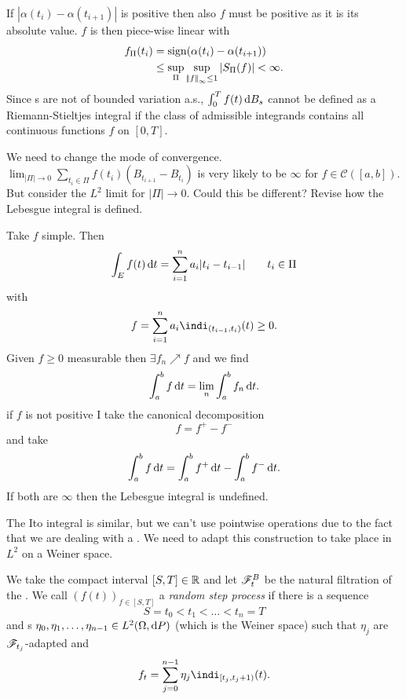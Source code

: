 \documentclass[crop=false, class=article]{standalone}
\begin{document}
\begin{fancyproof}
\begin{figure}[H]
		\label{fig:screenshot001}
	\end{figure}
	If $|\alpha(t_{i})-\alpha(t_{i+1})|$ is positive then also $f$ must be positive as it is its absolute value. $f$ is then piece-wise linear with 
	\begin{align*}
		f_{\Pi}(t_{i}) & =\mathrm{sign}(\alpha(t_{i})-\alpha(t_{i+1}))\\
		 & \leq\sup_{\Pi}\sup_{\left|\negthinspace\left|f\right|\negthinspace\right|_{\infty}\leq1}|S_{\Pi}(f)|<\infty.
	\end{align*}
	Since \brm s are not of bounded variation a.s., $\int_{0}^{T}f(t)\mathop{}\!\mathrm{d} B_{s}$ cannot be defined as a Riemann-Stieltjes integral if the class of admissible integrands contains all continuous functions $f$ on $[0,T]$.
\end{fancyproof}
We need to change the mode of convergence. $\lim_{|\Pi|\to 0}\sum_{t_i\in\Pi}f(t_{i})(B_{t_{i+1}}-B_{t_{i}})$ is very likely to be $\infty$ for $f\in\mathcal{C}([a,b])$. But consider the $L^{2}$ limit for $|\Pi|\to0$. Could this be different? Revise how the Lebesgue integral is defined.
\begin{revise}
	Take $f$ simple. Then
	\begin{equation*}
		\int_{E}f(t)\mathop{}\!\mathrm{d} t=\sum_{i=1}^{n}a_{i}|t_{i}-t_{i-1}| \qquad t_{i}\in\Pi
	\end{equation*}
	with
	\begin{equation*}
		f=\sum_{i=1}^{n}a_{i}\indi_{(t_{i-1},t_{i})}(t)\geq0.
	\end{equation*}
	Given $f\geq0$ measurable then $\exists f_{n}\nearrow f$ and we find
	\begin{equation*}
		\int_{a}^{b}f\mathop{}\!\mathrm{d} t=\lim_{n}\int_{a}^{b}f_{n}\mathop{}\!\mathrm{d} t.
	\end{equation*}
	if $f$ is not positive I take the canonical decomposition
	\begin{equation*}
		f=f^{+}-f^{-}
	\end{equation*}
	and take
	\begin{equation*}
			\int_{a}^{b}f\mathop{}\!\mathrm{d} t=	\int_{a}^{b}f^{+}\mathop{}\!\mathrm{d} t-	\int_{a}^{b}f^{-}\mathop{}\!\mathrm{d} t.
	\end{equation*}
	If both are $\infty$ then the Lebesgue integral is undefined.
\end{revise}
The Ito integral is similar, but we can't use pointwise operations due to the fact that we are dealing with a \brm{}. We need to adapt this construction to take place in $L^{2}$ on a Weiner space.
\begin{definition}
	We take the compact interval $[S,T]\in\mathbb{R}$ and let $\mathscr{F}^{B}_{t}$ be the natural filtration of the \brm. We call ${(f(t))}_{f\in[S,T]}$ a \emph{random step process} if there is a sequence
	\begin{equation*}
		S=t_{0}<t_1<\ldots<t_n=T
	\end{equation*}
	and \rv s $\eta_0,\eta_1,\ldots,\eta_{n-1}\in L^{2}(\Omega,\mathop{}\!\mathrm{d} P)$ (which is the Weiner space) such that $\eta_j$ are $\mathscr{F}_{t_j}$-adapted and
	\begin{equation*}
		f_{t}=\sum_{j=0}^{n-1}\eta_j\indi_{[t_j,t_j+1)}(t).
	\end{equation*}
\end{definition}
\end{document}
